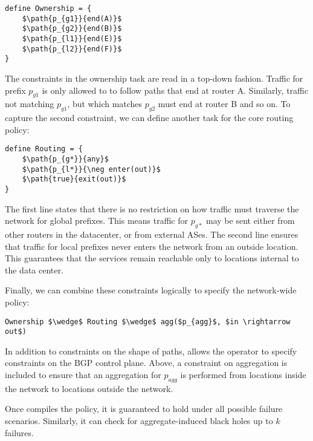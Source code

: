 \begin{lstlisting}[mathescape=true]
define Ownership = {
    $\path{p_{g1}}{end(A)}$
    $\path{p_{g2}}{end(B)}$
    $\path{p_{l1}}{end(E)}$
    $\path{p_{l2}}{end(F)}$
}
\end{lstlisting}

The constraints in the ownership task are read in a top-down fashion. Traffic for prefix $p_{g1}$ is only allowed to to follow paths that end at router A. Similarly, traffic not matching $p_{g1}$, but which matches $p_{g2}$ must end at router B and so on. 
%
To capture the second constraint, we can define another task for the core routing policy:

\begin{lstlisting}[mathescape=true]
define Routing = {
    $\path{p_{g*}}{any}$
    $\path{p_{l*}}{\neg enter(out)}$
    $\path{true}{exit(out)}$
}
\end{lstlisting}

The first line states that there is no restriction on how traffic must traverse the network for global prefixes. This means traffic for $p_{g*}$ may be sent either from other routers in the datacenter, or from external ASes. The second line ensures that traffic for local prefixes never enters the network from an outside location. This  guarantees that the services remain reachable only to locations internal to the data center.

Finally, we can combine these constraints logically to specify the network-wide policy:

\begin{lstlisting}[mathescape=true]
Ownership $\wedge$ Routing $\wedge$ agg($p_{agg}$, $in \rightarrow out$)
\end{lstlisting}


In addition to constraints on the shape of paths, \sysname allows the operator to specify constraints on the BGP control plane. Above, a constraint on aggregation is included to ensure that an aggregation for $p_{agg}$ is performed from locations inside the network to locations outside the network.

Once \sysname compiles the policy, it is guaranteed to hold under all possible failure scenarios. Similarly, it can check for aggregate-induced black holes up to $k$ failures. 




